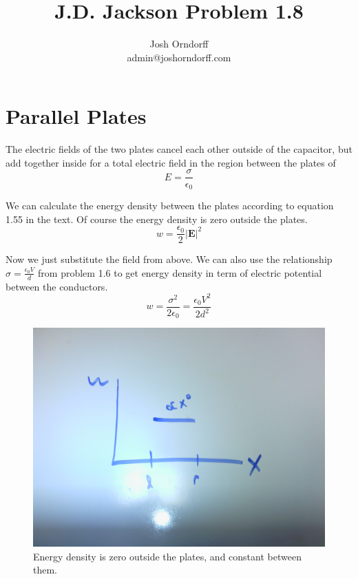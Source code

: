 \documentclass[10pt,a4paper]{article}
\begin{document}
\title{J.D. Jackson Problem 1.8}
\author{Josh Orndorff \\ admin@joshorndorff.com}
\maketitle

\section{Parallel Plates}
The electric fields of the two plates cancel each other outside of the capacitor, but add together inside for a total electric field in the region between the plates of
\begin{equation}
E=\frac{\sigma}{\epsilon_0}
\end{equation}

We can calculate the energy density between the plates according to equation 1.55 in the text. Of course the energy density is zero outside the plates.
\begin{equation}
w=\frac{\epsilon_0}{2}|\mathbf{E}|^2
\end{equation}

Now we just substitute the field from above. We can also use the relationship $\sigma=\frac{\epsilon_0 V}{d}$ from problem 1.6 to get energy density in term of electric potential between the conductors.
\begin{equation}
w=\frac{\sigma^2}{2\epsilon_0}=\frac{\epsilon_0 V^2}{2d^2}
\end{equation}

\begin{figure}[h]
\centering
\includegraphics[scale=.1]{Jackson1-8-plates.jpg}
\caption{Energy density is zero outside the plates, and constant between them.}
\end{figure}
\end{document}
